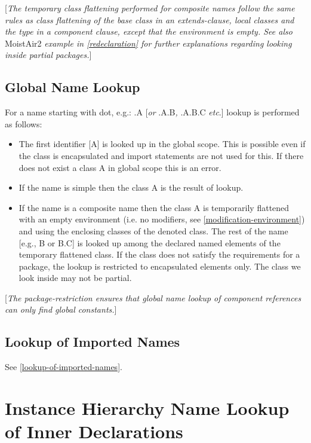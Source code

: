 \documentclass[10pt,a4paper]{report}
\def\doublelabel#1{\label{#1}}
\begin{document}
{[}\emph{The temporary class flattening performed for composite names
follow the same rules as class flattening of the base class in an
extends-clause, local classes and the type in a component clause, except
that the environment is empty. See also} MoistAir2 \emph{example in
\ref{redeclaration} for further explanations regarding looking inside
partial packages.}{]}

\subsection{Global Name Lookup}\doublelabel{global-name-lookup}

For a name starting with dot, e.g.: .A {[}\emph{or} .A.B\emph{,} .A.B.C
\emph{etc}.{]} lookup is performed as follows:

\begin{itemize}
\item
  The first identifier [A] is looked up in the global scope. This is
  possible even if the class is encapsulated and import statements are
  not used for this. If there does not exist a class A in global scope
  this is an error.
\item
  If the name is simple then the class A is the result of lookup.
\item
  If the name is a composite name then the class A is temporarily
  flattened with an empty environment (i.e. no modifiers, see 
  \ref{modification-environment}) and using the enclosing classes of the denoted class. The rest
  of the name [e.g., B or B.C] is looked up among the declared named
  elements of the temporary flattened class. If the class does not
  satisfy the requirements for a package, the lookup is restricted to
  encapsulated elements only. The class we look inside may not be
  partial.
\end{itemize}

{[}\emph{The package-restriction ensures that global name lookup of
component references can only find global constants.}{]}

\subsection{Lookup of Imported Names}\doublelabel{lookup-of-imported-names1}

See \ref{lookup-of-imported-names}.

\section{Instance Hierarchy Name Lookup of Inner Declarations}\doublelabel{instance-hierarchy-name-lookup-of-inner-declarations}
\end{document}
